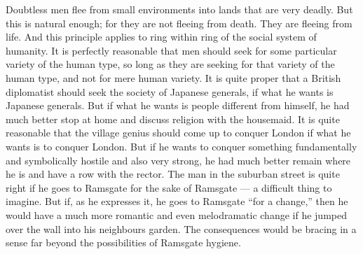 Doubtless men flee from small environments into lands that are very deadly. But this is natural enough; for they are not fleeing from death. They are fleeing from life. And this principle applies to ring within ring of the social system of humanity. It is perfectly reasonable that men should seek for some particular variety of the human type, so long as they are seeking for that variety of the human type, and not for mere human variety. It is quite proper that a British diplomatist should seek the society of Japanese generals, if what he wants is Japanese generals. But if what he wants is people different from himself, he had much better stop at home and discuss religion with the housemaid. It is quite reasonable that the village genius should come up to conquer London if what he wants is to conquer London. But if he wants to conquer something fundamentally and symbolically hostile and also very strong, he had much better remain where he is and have a row with the rector. The man in the suburban street is quite right if he goes to Ramsgate for the sake of Ramsgate — a difficult thing to imagine. But if, as he expresses it, he goes to Ramsgate “for a change,” then he would have a much more romantic and even melodramatic change if he jumped over the wall into his neighbours garden. The consequences would be bracing in a sense far beyond the possibilities of Ramsgate hygiene.

